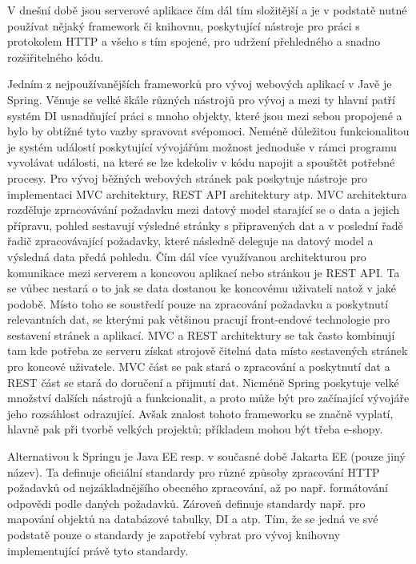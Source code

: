 \begin{itemize}
\begin{itemize}
		V dnešní době jsou serverové aplikace čím dál tím složitější a je v podstatě nutné používat nějaký framework
		či knihovnu, poskytující nástroje pro práci s protokolem \Ac{HTTP} a všeho s tím spojené, pro udržení
		přehledného a snadno rozšiřitelného kódu.

		Jedním z nejpoužívanějších frameworků pro vývoj webových aplikací v Javě je Spring.
		Věnuje se velké škále různých nástrojů pro vývoj a mezi ty hlavní patří systém \noindent\Ac{DI} usnadňující práci s
		mnoho objekty, které jsou mezi sebou propojené a bylo by obtížné tyto vazby spravovat svépomoci.
		Neméně důležitou funkcionalitou je systém událostí poskytující vývojářům možnost jednoduše v rámci programu vyvolávat
		události, na které se lze kdekoliv v kódu napojit a spouštět potřebné procesy. \cite{spring_framework_documentation_core}
		Pro vývoj běžných webových stránek pak poskytuje nástroje pro implementaci \noindent\Ac{MVC}
		architektury, \noindent\Ac{REST} API architektury atp. \cite{spring_framework_documentaiton_web}
		\Ac{MVC} architektura rozděluje zpracovávání požadavku mezi datový model starající se o data a jejich přípravu,
		pohled sestavují výsledné stránky s připravených dat a v poslední řadě řadič zpracovávající požadavky,
		které následně deleguje na datový model a výsledná data předá pohledu. \cite{mvc}
		Čím dál více využívanou architekturou pro komunikace mezi serverem a koncovou aplikací nebo stránkou je \Ac{REST} API.
		Ta se vůbec nestará o to jak se data dostanou ke koncovému uživateli natož v jaké podobě.
		Místo toho se soustředí pouze na zpracování požadavku a poskytnutí relevantních dat, se kterými pak
		většinou pracují front-endové technologie pro sestavení stránek a aplikací. \cite{restfulapi}
		\ac{MVC} a \ac{REST} architektury se tak často kombinují tam kde potřeba ze serveru získat strojově čitelná data
		místo sestavených stránek pro koncové uživatele. \ac{MVC} část se pak stará o zpracování a poskytnutí dat
		a \ac{REST} část se stará do doručení a přijmutí dat.
		Nicméně Spring poskytuje velké množství dalších nástrojů a funkcionalit, a proto může být pro začínající vývojáře
		jeho rozsáhlost odrazující.
		Avšak znalost tohoto frameworku se značně vyplatí, hlavně pak při tvorbě velkých projektů; příkladem mohou být
		třeba e-shopy.

		Alternativou k Springu je Java EE resp. v současné době Jakarta EE (pouze jiný název).
		Ta definuje oficiální standardy pro různé způsoby zpracování \Ac{HTTP} požadavků od nejzákladnějšího obecného
		zpracování, až po např. formátování odpovědi podle daných požadavků.
		Zároveň definuje standardy např. pro mapování objektů na databázové tabulky, \Ac{DI} a atp.
		Tím, že se jedná ve své podstatě pouze o standardy je zapotřebí vybrat pro vývoj knihovny implementující právě tyto
		standardy. \cite{jakarta_ee}


\end{itemize}
\end{itemize}
